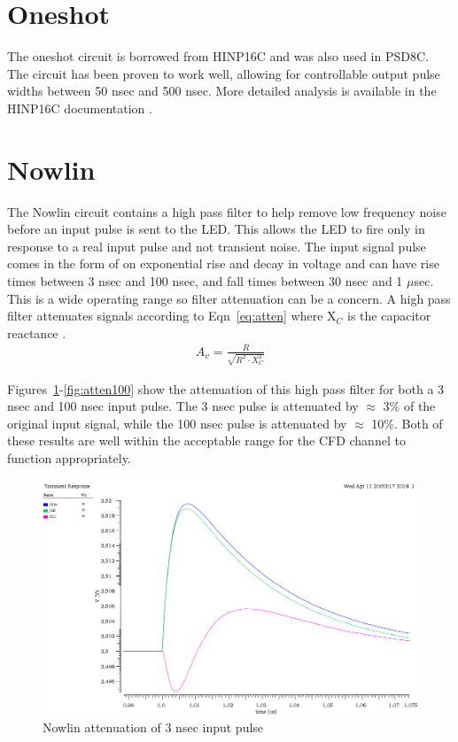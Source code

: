\documentclass[12pt,oneside,final]{siuethesis}
\theoremstyle{definition}
\begin{document}
\section{Oneshot}
\par The oneshot circuit is borrowed from HINP16C and was also used in PSD8C. The circuit has been proven to work well, allowing for controllable output pulse widths between 50 nsec and 500 nsec. More detailed analysis is available in the HINP16C documentation \cite{HINP-THESIS}.

\section{Nowlin}
\par The Nowlin circuit contains a high pass filter to help remove low frequency noise before an input pulse is sent to the LED. This allows the LED to fire only in response to a real input pulse and not transient noise. The input signal pulse comes in the form of on exponential rise and decay in voltage and can have rise times between 3 nsec and 100 nsec, and fall times between 30 nsec and 1 $\mu$sec. This is a wide operating range so filter attenuation can be a concern. A high pass filter attenuates signals according to Eqn~\ref{eq:atten} where X$_{C}$ is the capacitor reactance \cite{CIRCUITS}.
\begin{align}
A_{v} = \frac{R}{\sqrt{R^{2} \cdot X_{C}^{2}}}
\label{eq:atten}
\end{align}
\par Figures~\ref{fig:atten3}-\ref{fig:atten100} show the attenuation of this high pass filter for both a 3 nsec and 100 nsec input pulse. The 3 nsec pulse is attenuated by $\approx$ 3\% of the original input signal, while the 100 nsec pulse is attenuated by $\approx$ 10\%. Both of these results are well within the acceptable range for the CFD channel to function appropriately.
\begin{figure}[htbp!]
\centering
\includegraphics[scale=.55,keepaspectratio=true]{data/nowlin_3n_atten.png}
\caption{Nowlin attenuation of 3 nsec input pulse}
\label{fig:atten3}
\end{figure}
\end{document}
